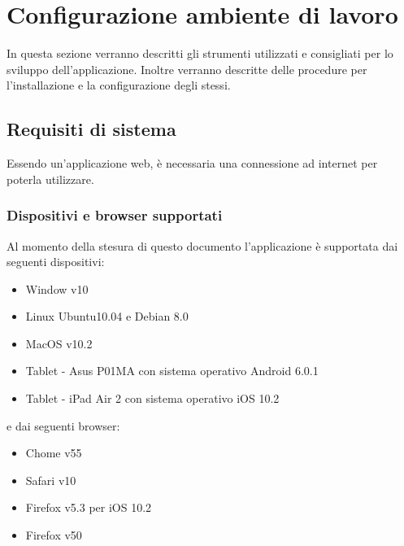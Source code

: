 \newpage

\section{Configurazione ambiente di lavoro}
In questa sezione verranno descritti gli strumenti utilizzati e consigliati per lo sviluppo dell'applicazione. Inoltre verranno descritte delle procedure per l'installazione e la configurazione degli stessi.
%
	\subsection{Requisiti di sistema}
	Essendo \progetto{} un'applicazione web, è necessaria una connessione ad internet per poterla utilizzare.
	\subsubsection{Dispositivi e browser supportati}
		Al momento della stesura di questo documento l'applicazione è supportata dai seguenti dispositivi:
		\begin{itemize}
			\item Window v10
			\item Linux Ubuntu10.04 e Debian 8.0
			\item MacOS v10.2
			\item Tablet - Asus P01MA con sistema operativo Android 6.0.1
			\item Tablet - iPad Air 2 con sistema operativo iOS 10.2
		\end{itemize}
		e dai seguenti browser:
		\begin{itemize}
			\item Chome v55
			\item Safari v10
			\item Firefox v5.3 per iOS 10.2
			\item Firefox v50
		\end{itemize}
